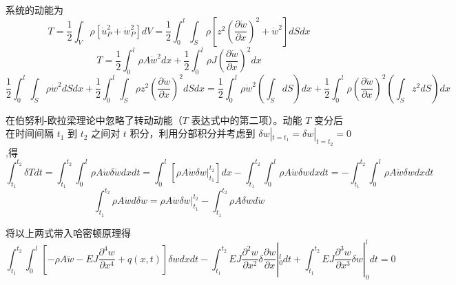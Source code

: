 \documentclass[12pt,a4paper]{article}
\begin{document}
系统的动能为
$$
T=\frac{1}{2}\int_{V}\rho\left[\dot{u}^2_P+\dot{w}^2_P\right]dV=\frac{1}{2}\int_{0}^{l}\int_{S}\rho\left[z^2\left(\frac{\partial\dot{w}}{\partial x}\right)^2+\dot{w}^2\right]dSdx
$$
$$
T=\frac{1}{2}\int_{0}^{l}\rho A\dot{w}^2dx+\frac{1}{2}\int_{0}^{l}\rho J\left(\frac{\partial\dot{w}}{\partial x}\right)^2dx
$$
$$
\frac{1}{2}\int_{0}^{l}\int_{S}\rho\dot{w}^2dSdx+\frac{1}{2}\int_{0}^{l}\int_{S}\rho z^2\left(\frac{\partial\dot{w}}{\partial x}\right)^2dSdx=\frac{1}{2}\int_{0}^{l}\rho\dot{w}^2\left(\int_{S}dS\right)dx+\frac{1}{2}\int_{0}^{l}\rho\left(\frac{\partial\dot{w}}{\partial x}\right)^2\left(\int_{S}z^2dS\right)dx
$$

在伯努利-欧拉梁理论中忽略了转动动能（$T$ 表达式中的第二项）。动能 $T$ 变分后在时间间隔 $t_1$ 到 $t_2$ 之间对 $t$ 积分，利用分部积分并考虑到 $\delta w|_{t=t_1}=\delta w|_{t=t_2}=0$,得
$$
\int_{t_1}^{t_2}\delta Tdt=\int_{t_1}^{t_2}\int_{0}^{l}\rho A\dot{w}\delta\dot{w}dxdt=\int_{0}^{l}\left[\rho A\dot{w}\delta w|_{t_1}^{t_2}\right]dx-\int_{t_1}^{t_2}\int_{0}^{l}\rho A\ddot{w}\delta wdxdt=-\int_{t_1}^{t_2}\int_{0}^{l}\rho A\ddot{w}\delta wdxdt
$$
$$
\int_{t_1}^{t_2}\rho A\dot{w}d\delta w=\rho A\dot{w}\delta w|_{t_1}^{t_2}-\int_{t_1}^{t_2}\rho A\delta wd\dot{w}
$$

将以上两式带入哈密顿原理得
$$
\int_{t_1}^{t_2}\int_{0}^{l}\left[-\rho A\ddot{w}-EJ\frac{\partial^4 w}{\partial x^4}+q(x,t)\right]\delta wdxdt-\int_{t_1}^{t_2}EJ\frac{\partial^2 w}{\partial x^2}\delta\frac{\partial w}{\partial x}|_0^ldt+\int_{t_1}^{t_2}EJ\frac{\partial^3 w}{\partial x^3}\delta w|_0^ldt=0
$$
\end{document}
